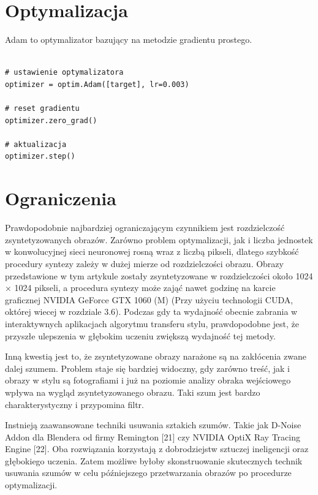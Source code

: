 \documentclass[brudnopis]{xmgr}
\begin{document}
\section{Optymalizacja\label{s:dsssl}}

Adam to optymalizator bazujący na metodzie gradientu prostego.

\begin{lstlisting}

# ustawienie optymalizatora
optimizer = optim.Adam([target], lr=0.003)
      
# reset gradientu
optimizer.zero_grad()
      
# aktualizacja
optimizer.step()

\end{lstlisting}

						
\section{Ograniczenia\label{s:dsssl}}

Prawdopodobnie najbardziej ograniczającym czynnikiem jest rozdzielczość zsyntetyzowanych obrazów. Zarówno problem optymalizacji, jak i liczba jednostek w konwolucyjnej sieci neuronowej rosną wraz z liczbą pikseli, dlatego szybkość procedury syntezy zależy w dużej mierze od rozdzielczości obrazu. Obrazy przedstawione w tym artykule zostały zsyntetyzowane w rozdzielczości około 1024 × 1024 pikseli, a procedura syntezy może zająć nawet godzinę na karcie graficznej NVIDIA GeForce GTX 1060 (M) (Przy użyciu technologii CUDA, októrej wiecej w rozdziale 3.6). Podczas gdy ta wydajność obecnie zabrania w interaktywnych aplikacjach algorytmu transferu stylu, prawdopodobne jest, że przyszłe ulepszenia w głębokim uczeniu zwiększą wydajność tej metody.

Inną kwestią jest to, że zsyntetyzowane obrazy narażone są na zakłócenia zwane dalej szumem.  Problem staje się bardziej widoczny, gdy zarówno treść, jak i obrazy w stylu są fotografiami i już na poziomie analizy obraka wejściowego wpływa na wygląd zsyntetyzowanego obrazu. Taki szum jest bardzo charakterystyczny i przypomina filtr. 

Instnieją zaawansowane techniki usuwania sztakich szumów. Takie jak D-Noise Addon dla Blendera od firmy Remington [21] czy NVIDIA OptiX Ray Tracing Engine [22]. Oba rozwiązania korzystają z dobrodziejstw sztuczej ineligencji oraz głębokiego uczenia. Zatem możliwe byłoby skonstruowanie skutecznych technik usuwania szumów w celu późniejszego przetwarzania obrazów po procedurze optymalizacji.
 \\
\end{document}
